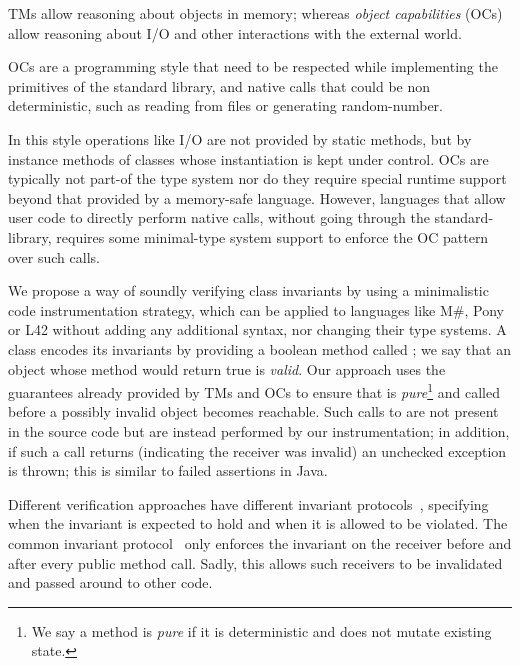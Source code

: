 TMs allow reasoning about objects in memory; whereas
\emph{object capabilities} (OCs) allow reasoning about
I/O and other interactions with the external world.


OCs are a programming style that need to be respected while implementing the primitives of the standard library, and native calls that could be non deterministic, such as reading from files or generating random-number.

In this style operations like I/O are not provided by static methods, but by instance methods of classes whose instantiation is kept under control.
OCs are typically not part-of the type system nor do they require special runtime support beyond that provided by a memory-safe language. However, languages that allow user code to directly perform native calls, without going through the standard-library, requires some minimal-type system support to enforce the OC pattern over such calls.




We propose a way of soundly verifying class invariants by using a minimalistic code instrumentation strategy, which can be applied to languages like M\#, Pony or  L42  without adding any additional syntax, nor changing their type systems.
 A class encodes its invariants by providing a boolean method called \Q@invariant@; we say that an object whose \Q@invariant@ method would return true is \emph{valid}. Our approach uses the guarantees already provided by TMs and OCs to ensure that \Q@invariant@ is \emph{pure}\footnote{We say a method is \emph{pure} if it is deterministic and does not mutate existing state.} and called before a possibly invalid object becomes reachable. Such calls to \Q@invariant@ are not present in the source code but are instead performed by our instrumentation; in addition, if such a call returns \Q@false@ (indicating the receiver was invalid) an unchecked exception is thrown; this is similar to failed assertions in Java.

Different verification approaches have different invariant protocols~\cite{FlexibleInvariants}, specifying when the invariant is expected to hold and when it is allowed to be violated.
The common invariant protocol~\cite{?}
only enforces the invariant on the receiver before and after every public method call. Sadly, this allows such receivers to be invalidated and passed around to other code.

